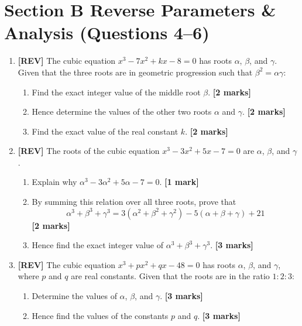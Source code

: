 \documentclass[11pt,a4paper]{article}
\begin{document}
\section*{Section B \quad Reverse Parameters \& Analysis \hfill{\normalfont\footnotesize(Questions 4--6)}}
\begin{enumerate}[resume]

\item \textbf{[REV]} The cubic equation $x^3 - 7x^2 + kx - 8 = 0$ has roots $\alpha$, $\beta$, and $\gamma$.
Given that the three roots are in geometric progression such that $\beta^2 = \alpha\gamma$:
\begin{enumerate}[label=(\alph*)]
  \item Find the exact integer value of the middle root $\beta$. \hfill{\textbf{[2 marks]}}
  \item Hence determine the values of the other two roots $\alpha$ and $\gamma$. \hfill{\textbf{[2 marks]}}
  \item Find the exact value of the real constant $k$. \hfill{\textbf{[2 marks]}}
\end{enumerate}

\item \textbf{[REV]} The roots of the cubic equation $x^3 - 3x^2 + 5x - 7 = 0$ are $\alpha$, $\beta$, and $\gamma$.
\begin{enumerate}[label=(\alph*)]
  \item Explain why $\alpha^3 - 3\alpha^2 + 5\alpha - 7 = 0$. \hfill{\textbf{[1 mark]}}
  \item By summing this relation over all three roots, prove that
  \[
  \alpha^3 + \beta^3 + \gamma^3 = 3(\alpha^2 + \beta^2 + \gamma^2) - 5(\alpha + \beta + \gamma) + 21
  \]
  \hfill{\textbf{[2 marks]}}
  \item Hence find the exact integer value of $\alpha^3 + \beta^3 + \gamma^3$. \hfill{\textbf{[3 marks]}}
\end{enumerate}

\item \textbf{[REV]} The cubic equation $x^3 + px^2 + qx - 48 = 0$ has roots $\alpha$, $\beta$, and $\gamma$, where $p$ and $q$ are real constants.
Given that the roots are in the ratio $1 : 2 : 3$:
\begin{enumerate}[label=(\alph*)]
  \item Determine the values of $\alpha$, $\beta$, and $\gamma$. \hfill{\textbf{[3 marks]}}
  \item Hence find the values of the constants $p$ and $q$. \hfill{\textbf{[3 marks]}}
\end{enumerate}

\end{enumerate}
\end{document}
